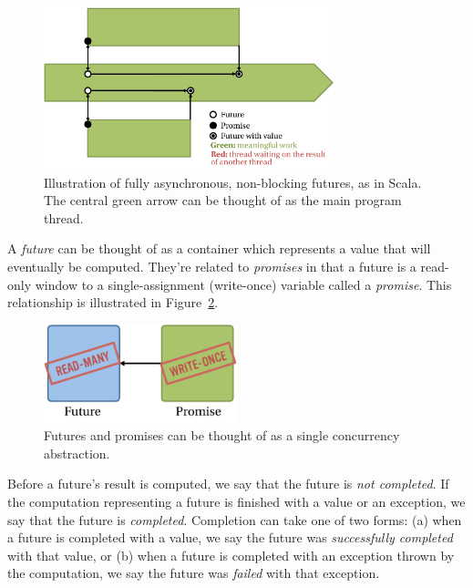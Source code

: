 \begin{figure}[!t]
\centering
\includegraphics[width=0.75\textwidth]{images/future-promise-basic-async}
\caption{Illustration of fully asynchronous, non-blocking futures, as in Scala. The central green arrow can be thought of as the main program thread.}
\label{fig:future-promise-async}
\end{figure}


A {\em future} can be thought of as a container which represents a value that
will eventually be computed. They're related to {\em promises} in that a future
is a read-only window to a single-assignment (write-once) variable called a {\em
promise}. This relationship is illustrated in
Figure~\ref{fig:future-promise-basic}.

\begin{figure}[!t]
\centering
\includegraphics[width=0.5\textwidth]{images/future-promise-basic}
\caption{Futures and promises can be thought of as a single concurrency abstraction.}
\label{fig:future-promise-basic}
\end{figure}

Before a future's result is computed, we say that the future is {\em not
completed}. If the computation representing a future is finished with a value or
an exception, we say that the future is {\em completed}. Completion can take one
of two forms: (a) when a future is completed with a value, we say the future was
{\em successfully completed} with that value, or (b) when a future is completed
with an exception thrown by the computation, we say the future was {\em failed}
with that exception.

